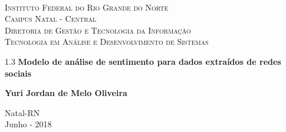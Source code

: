 
\begin{titlepage}
	\begin{center}
		
		  
		\begin{minipage}{11.15cm}
			\begin{center}
				\begin{espacosimples}
					{\small \ \\
                       \textsc{Instituto Federal do Rio Grande do Norte}
                       \\
							  \textsc{Campus Natal - Central}					\\
							  \textsc{Diretoria de Gestão e Tecnologia da Informação}	   
							  \\
							  \textsc{Tecnologia em Análise e Desenvolvimento de Sistemas}}   	
                       \\
				\end{espacosimples}
			\end{center}
		\end{minipage}

			
		\vspace{6cm}
						
		{\setlength{\baselineskip}%
		{1.3\baselineskip}
		{\LARGE \textbf{Modelo de análise de sentimento para dados extraídos de redes sociais}}\par}
			
		\vspace{3cm}
			
		{\large \textbf{Yuri Jordan de Melo Oliveira}}
						
		\vspace{6cm}
		
		Natal-RN\\Junho - 2018
	\end{center}
\end{titlepage}